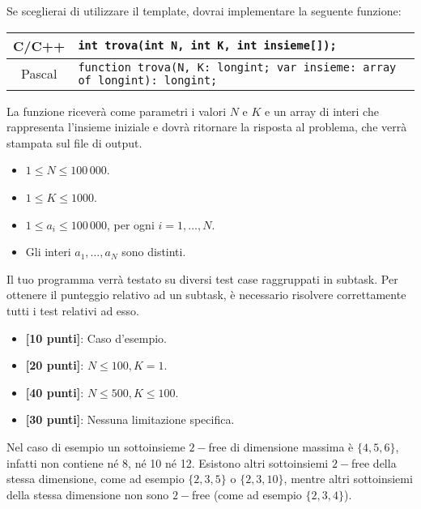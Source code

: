 Se sceglierai di utilizzare il template, dovrai implementare la seguente funzione:
\begin{center}\begin{tabularx}{\textwidth}{|c|X|}
\hline
C/C++  & \verb|int trova(int N, int K, int insieme[]);|\\
\hline
Pascal & \verb|function trova(N, K: longint; var insieme: array of longint): longint;|\\
\hline
\end{tabularx}\end{center}
La funzione riceverà come parametri i valori $N$ e $K$ e un array di interi che rappresenta l'insieme iniziale e dovrà ritornare la risposta al problema, che verrà stampata sul file di output.

\Constraints 
\begin{itemize}[nolistsep,itemsep=2mm]
  \item $1 \le N \le 100\,000$.
  \item $1 \le K \le 1000$.
  \item $1 \le a_i \le 100\,000$, per ogni $i=1,\ldots,N$.
  \item Gli interi $a_1, \ldots, a_N$ sono distinti.
\end{itemize}

\pagebreak
\Scoring
Il tuo programma verrà testato su diversi test case raggruppati in subtask.
Per ottenere il punteggio relativo ad un subtask, è necessario risolvere
correttamente tutti i test relativi ad esso.

\begin{itemize}[nolistsep,itemsep=2mm]
  \item \textbf{ [10 punti]}: Caso d'esempio.
  \item \textbf{ [20 punti]}: $N \le 100, K = 1$.
  \item \textbf{ [40 punti]}: $N \le 500, K \le 100$.
  \item \textbf{ [30 punti]}: Nessuna limitazione specifica.
\end{itemize}

\Examples
\begin{example}
%
\end{example}

\Explanation
Nel caso di esempio un sottoinsieme $2-$free di dimensione massima è $\{4, 5, 6\}$, infatti non contiene né 8, né 10 né 12. Esistono altri sottoinsiemi $2-$free della stessa dimensione, come ad esempio $\{2, 3, 5\}$ o  $\{2, 3, 10\}$, mentre altri sottoinsiemi della stessa dimensione non sono $2-$free (come ad esempio $\{2, 3, 4\}$).

